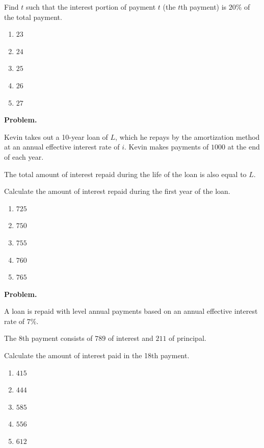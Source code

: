 \documentclass[11pt]{article}
\begin{document}
Find $t$ such that the interest portion of payment $t$ (the $t$th payment) is $20\%$ of the total payment.

\begin{enumerate}[label=\Alph*.]
    \item $23$
    \item $24$
    \item $25$
    \item $26$
    \item $27$
\end{enumerate}


\newpage



\textbf{Problem.}

Kevin takes out a 10-year loan of $L$, which he repays by the amortization method at an annual effective interest rate of $i$. Kevin makes payments of $1000$ at the end of each year.

The total amount of interest repaid during the life of the loan is also equal to $L$.

Calculate the amount of interest repaid during the first year of the loan.

\begin{enumerate}[label=\Alph*.]
    \item $725$
    \item $750$
    \item $755$
    \item $760$
    \item $765$
\end{enumerate}


\newpage


\textbf{Problem.}

A loan is repaid with level annual payments based on an annual effective interest rate of $7\%$.

The 8th payment consists of $789$ of interest and $211$ of principal.

Calculate the amount of interest paid in the 18th payment.

\begin{enumerate}[label=\Alph*.]
    \item $415$
    \item $444$
    \item $585$
    \item $556$
    \item $612$
\end{enumerate}

\newpage
\end{document}
